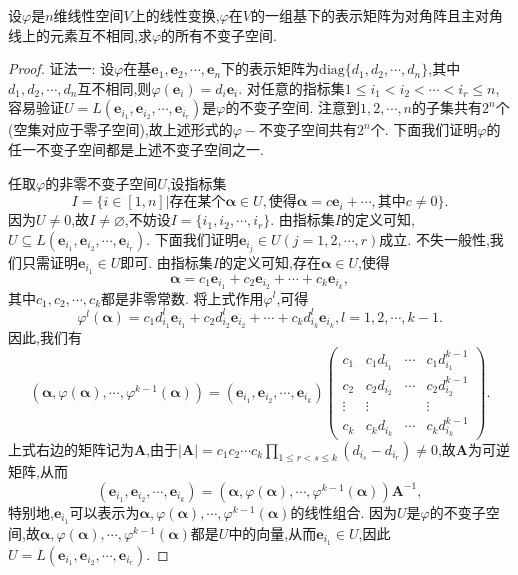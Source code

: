\documentclass[../../main.tex]{subfiles}
\begin{document}
\begin{example}
设\(\varphi\)是\(n\)维线性空间\(V\)上的线性变换,\(\varphi\)在\(V\)的一组基下的表示矩阵为对角阵且主对角线上的元素互不相同,求\(\varphi\)的所有不变子空间.
\end{example}
\begin{proof}
{\color{blue}证法一:}
设\(\varphi\)在基\(\boldsymbol{e}_1,\boldsymbol{e}_2,\cdots,\boldsymbol{e}_n\)下的表示矩阵为\(\text{diag}\{d_1,d_2,\cdots,d_n\}\),其中\(d_1,d_2,\cdots,d_n\)互不相同,则\(\varphi(\boldsymbol{e}_i)=d_i\boldsymbol{e}_i\). 对任意的指标集\(1\leq i_1 < i_2 < \cdots < i_r\leq n\),容易验证\(U = L(\boldsymbol{e}_{i_1},\boldsymbol{e}_{i_2},\cdots,\boldsymbol{e}_{i_r})\)是\(\varphi\)的不变子空间. 注意到\(1,2,\cdots,n\)的子集共有\(2^n\)个(空集对应于零子空间),故上述形式的\(\varphi -\)不变子空间共有\(2^n\)个. 下面我们证明\(\varphi\)的任一不变子空间都是上述不变子空间之一.

任取\(\varphi\)的非零不变子空间\(U\),设指标集
\[
I = \{i\in[1,n]|\text{存在某个}\boldsymbol{\alpha}\in U,\text{使得}\boldsymbol{\alpha}=c\boldsymbol{e}_i + \cdots,\text{其中}c\neq 0\}.
\]
因为\(U\neq 0\),故\(I\neq\varnothing\),不妨设\(I = \{i_1,i_2,\cdots,i_r\}\). 由指标集\(I\)的定义可知,\(U\subseteq L(\boldsymbol{e}_{i_1},\boldsymbol{e}_{i_2},\cdots,\boldsymbol{e}_{i_r})\). 下面我们证明\(\boldsymbol{e}_{i_j}\in U(j = 1,2,\cdots,r)\)成立. 不失一般性,我们只需证明\(\boldsymbol{e}_{i_1}\in U\)即可. 由指标集\(I\)的定义可知,存在\(\boldsymbol{\alpha}\in U\),使得
\[
\boldsymbol{\alpha}=c_1\boldsymbol{e}_{i_1}+c_2\boldsymbol{e}_{i_2}+\cdots + c_k\boldsymbol{e}_{i_k},
\]
其中\(c_1,c_2,\cdots,c_k\)都是非零常数. 将上式作用\(\varphi^l\),可得
\[
\varphi^l(\boldsymbol{\alpha})=c_1d_{i_1}^l\boldsymbol{e}_{i_1}+c_2d_{i_2}^l\boldsymbol{e}_{i_2}+\cdots + c_kd_{i_k}^l\boldsymbol{e}_{i_k},l = 1,2,\cdots,k - 1.
\]
因此,我们有
\[
(\boldsymbol{\alpha},\varphi(\boldsymbol{\alpha}),\cdots,\varphi^{k - 1}(\boldsymbol{\alpha}))=(\boldsymbol{e}_{i_1},\boldsymbol{e}_{i_2},\cdots,\boldsymbol{e}_{i_k})
\begin{pmatrix}
c_1&c_1d_{i_1}&\cdots&c_1d_{i_1}^{k - 1}\\
c_2&c_2d_{i_2}&\cdots&c_2d_{i_2}^{k - 1}\\
\vdots&\vdots&&\vdots\\
c_k&c_kd_{i_k}&\cdots&c_kd_{i_k}^{k - 1}
\end{pmatrix}.
\]
上式右边的矩阵记为\(\boldsymbol{A}\),由于\(|\boldsymbol{A}| = c_1c_2\cdots c_k\prod_{1\leq r < s\leq k}(d_{i_s}-d_{i_r})\neq 0\),故\(\boldsymbol{A}\)为可逆矩阵,从而
\[
(\boldsymbol{e}_{i_1},\boldsymbol{e}_{i_2},\cdots,\boldsymbol{e}_{i_k})=(\boldsymbol{\alpha},\varphi(\boldsymbol{\alpha}),\cdots,\varphi^{k - 1}(\boldsymbol{\alpha}))\boldsymbol{A}^{-1},
\]
特别地,\(\boldsymbol{e}_{i_1}\)可以表示为\(\boldsymbol{\alpha},\varphi(\boldsymbol{\alpha}),\cdots,\varphi^{k - 1}(\boldsymbol{\alpha})\)的线性组合. 因为\(U\)是\(\varphi\)的不变子空间,故\(\boldsymbol{\alpha},\varphi(\boldsymbol{\alpha}),\cdots,\varphi^{k - 1}(\boldsymbol{\alpha})\)都是\(U\)中的向量,从而\(\boldsymbol{e}_{i_1}\in U\),因此\(U = L(\boldsymbol{e}_{i_1},\boldsymbol{e}_{i_2},\cdots,\boldsymbol{e}_{i_r})\).


\end{proof}
\end{document}
